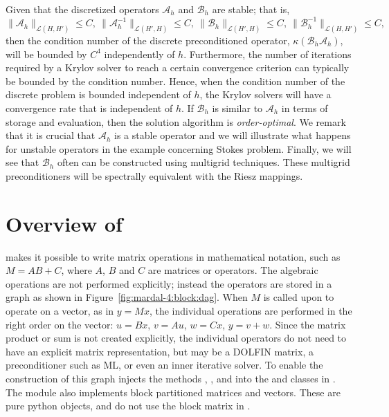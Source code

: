 Given that the discretized operators  $\mathcal{A}_h$ and $\mathcal{B}_h$ are stable; that is,
 \begin{equation}
\|\mathcal{A}_h\|_{\mathcal{L} (H, H')} \le C, \ \|\mathcal{A}_h^{-1}\|_{\mathcal{L} (H', H)} \le C, \
\|\mathcal{B}_h\|_{\mathcal{L}(H', H)} \le C,  \  \|\mathcal{B}_h^{-1}\|_{\mathcal{L}(H, H')} \le C,
\end{equation}
then the condition number of the discrete preconditioned operator,
$\kappa(\mathcal{B}_h \mathcal{A}_h)$, will be bounded by $C^4$
independently of $h$.  Furthermore, the number of iterations required
by a Krylov solver to reach a certain convergence criterion can
typically be bounded by the condition number. Hence, when the
condition number of the discrete problem is bounded independent of
$h$, the Krylov solvers will have a convergence rate that is
independent of $h$.  If $\mathcal{B}_h$ is similar to $\mathcal{A}_h$
in terms of storage and evaluation, then the solution algorithm
is \emph{order-optimal}.  We remark that it is crucial that
$\mathcal{A}_h$ is a stable operator and we will illustrate what
happens for unstable operators in the example concerning Stokes
problem.  Finally, we will see that $\mathcal{B}_h$ often can be
constructed using multigrid techniques. These multigrid
preconditioners will be spectrally equivalent with the Riesz mappings.

\section{Overview of }

 makes it possible to write matrix operations in mathematical notation, such as $M = A B+C$, where $A$, $B$ and $C$ are matrices or operators. The algebraic operations are not performed explicitly; instead the operators are stored in a graph as shown in Figure~\ref{fig:mardal-4:block:dag}. When $M$ is called upon to operate on a vector, as in $y=Mx$, the individual operations are performed in the right order on the vector: $u=Bx$, $v=Au$, $w=Cx$, $y=v+w$. Since the matrix product or sum is not created explicitly, the individual operators do not need to have an explicit matrix representation, but  may be a DOLFIN matrix, a preconditioner such as ML, or even an inner iterative solver.
To enable the construction of this graph \emp{cbc.block} injects the
methods \emp{\_\_mul\_\_}, \emp{\_\_add\_\_}, and \emp{\_\_sub\_\_}
into the \emp{Matrix} and \emp{Vector} classes in \dolfin.  The module
also implements block partitioned matrices and vectors. These are pure
python objects, and do not use the block matrix in \dolfin.

